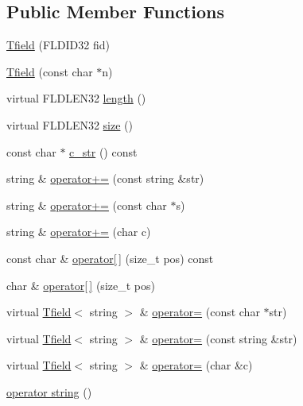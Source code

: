 \subsection*{Public Member Functions}
\begin{DoxyCompactItemize}
\item 
\hyperlink{classatmi_1_1_tfield_3_01string_01_4_acf3ba399e850813d9bc7029e20f3cf90}{Tfield} (F\+L\+D\+I\+D32 fid)
\item 
\hyperlink{classatmi_1_1_tfield_3_01string_01_4_af47d03e9d7fcabb4005118b6cf68b495}{Tfield} (const char $\ast$n)
\item 
virtual F\+L\+D\+L\+E\+N32 \hyperlink{classatmi_1_1_tfield_3_01string_01_4_aa087966002323328ac6a3eac0efb8b4b}{length} ()
\item 
virtual F\+L\+D\+L\+E\+N32 \hyperlink{classatmi_1_1_tfield_3_01string_01_4_a4294b2eeed43b7fec264022adbb5ae8a}{size} ()
\item 
const char $\ast$ \hyperlink{classatmi_1_1_tfield_3_01string_01_4_a7c5cff3adeba13f23d5240905d59806b}{c\+\_\+str} () const 
\item 
string \& \hyperlink{classatmi_1_1_tfield_3_01string_01_4_aa30e565a844720235f74662385bcb5a9}{operator+=} (const string \&str)
\item 
string \& \hyperlink{classatmi_1_1_tfield_3_01string_01_4_a7a5be64f8f6f83bc9db528ab1bed797d}{operator+=} (const char $\ast$s)
\item 
string \& \hyperlink{classatmi_1_1_tfield_3_01string_01_4_acd9bf2d1fe96a88aa25bb1d9c1377e1c}{operator+=} (char c)
\item 
const char \& \hyperlink{classatmi_1_1_tfield_3_01string_01_4_ae9ae83968b205215d3a4df0e14be84f0}{operator\mbox{[}$\,$\mbox{]}} (size\+\_\+t pos) const 
\item 
char \& \hyperlink{classatmi_1_1_tfield_3_01string_01_4_aecc471a2f6349775d4f148c588c97281}{operator\mbox{[}$\,$\mbox{]}} (size\+\_\+t pos)
\item 
virtual \hyperlink{classatmi_1_1_tfield}{Tfield}$<$ string $>$ \& \hyperlink{classatmi_1_1_tfield_3_01string_01_4_a4eb4f0262602f58c71b036b6a033c52e}{operator=} (const char $\ast$str)
\item 
virtual \hyperlink{classatmi_1_1_tfield}{Tfield}$<$ string $>$ \& \hyperlink{classatmi_1_1_tfield_3_01string_01_4_a3fb49fd82f01f8033cc540cbe4636248}{operator=} (const string \&str)
\item 
virtual \hyperlink{classatmi_1_1_tfield}{Tfield}$<$ string $>$ \& \hyperlink{classatmi_1_1_tfield_3_01string_01_4_ac2c57af61ba5979c7a5f8d862fa7810c}{operator=} (char \&c)
\item 
\hyperlink{classatmi_1_1_tfield_3_01string_01_4_ae844a83493829d97f60348d71a50ee97}{operator string} ()
\end{DoxyCompactItemize}
